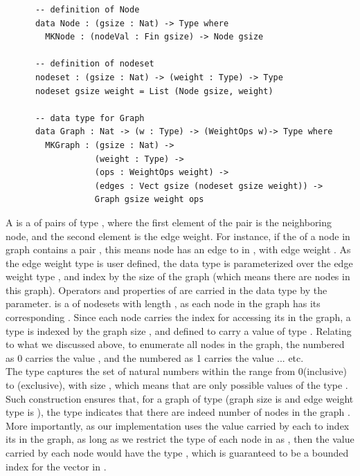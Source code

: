 \begin{lstlisting}
      -- definition of Node
      data Node : (gsize : Nat) -> Type where
        MKNode : (nodeVal : Fin gsize) -> Node gsize

      -- definition of nodeset
      nodeset : (gsize : Nat) -> (weight : Type) -> Type
      nodeset gsize weight = List (Node gsize, weight)

      -- data type for Graph
      data Graph : Nat -> (w : Type) -> (WeightOps w)-> Type where
        MKGraph : (gsize : Nat) ->
                  (weight : Type) ->
                  (ops : WeightOps weight) ->
                  (edges : Vect gsize (nodeset gsize weight)) ->
                  Graph gsize weight ops
\end{lstlisting}

A  is a  of pairs of type , where the first element of the pair is the neighboring node, and the second element is the edge weight. For instance, if the  of a node  in graph  contains a pair , this means node  has an edge to  in , with edge weight . As the edge weight type is user defined, the  data type is parameterized over the edge weight type , and index by the size of the graph (which means there are  nodes in this graph). Operators and properties of  are carried in the  data type by the  parameter.  is a  of {nodeset}s with length , as each node in the graph has its corresponding . Since each node carries the index for accessing its  in the graph, a  type is indexed by the graph size , and defined to carry a value of type . Relating to what we discussed above, to enumerate all nodes in the graph, the  numbered as 0 carries the value , and the  numbered as 1 carries the value  ... etc.
\\

The type  captures the set of natural numbers within the range from 0(inclusive) to (exclusive), with size , which means that are only  possible values of the type . Such construction ensures that, for a graph  of type  (graph size is  and edge weight type is ), the type  indicates that there are indeed  number of nodes in the graph . More importantly, as our implementation uses the value carried by each  to index its  in the graph, as long as we restrict the type of each node in  as , then the value carried by each node would have the type , which is guaranteed to be a bounded index for the vector  in . 
\\

